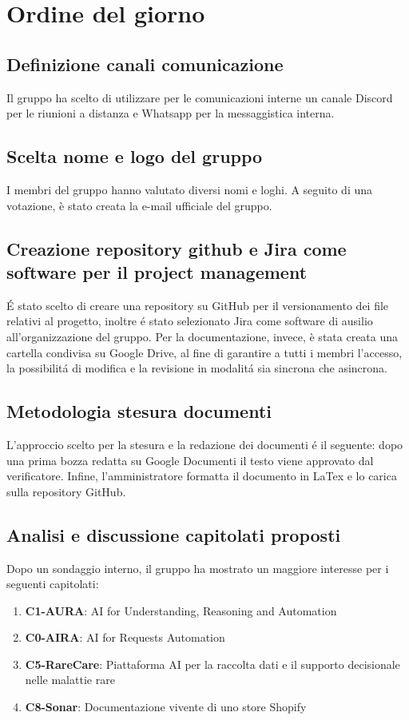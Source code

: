 \newpage
\vspace{0.8cm}

\section{Ordine del giorno}

\subsection{Definizione canali comunicazione}
Il gruppo ha scelto di utilizzare per le comunicazioni interne un canale Discord per le riunioni a distanza e Whatsapp per la messaggistica interna.

\subsection{Scelta nome e logo del gruppo}
I membri del gruppo hanno valutato diversi nomi e loghi. A seguito di una votazione, è stato creata la e-mail ufficiale del gruppo.

\subsection{Creazione repository github e Jira come software per il project management}
É stato scelto di creare una repository su GitHub per il versionamento dei file relativi al progetto, inoltre é stato selezionato Jira come software di ausilio all'organizzazione del gruppo. Per la documentazione, invece, è stata creata una cartella condivisa su Google Drive, al fine di garantire a tutti i membri l'accesso, la possibilitá di modifica e la revisione in modalitá sia sincrona che asincrona.

\subsection{Metodologia stesura documenti}
L'approccio scelto per la stesura e la redazione dei documenti é il seguente: dopo una prima bozza redatta su Google Documenti il testo viene approvato dal verificatore. Infine, l'amministratore formatta il documento in LaTex e lo carica sulla repository GitHub.

\subsection{Analisi e discussione capitolati proposti}
Dopo un sondaggio interno, il gruppo ha mostrato un maggiore interesse per i seguenti capitolati:
\begin{enumerate}
    \item \textbf{C1-AURA}: AI for Understanding, Reasoning and Automation
    \item \textbf{C0-AIRA}: AI for Requests Automation
    \item \textbf{C5-RareCare}: Piattaforma AI per la raccolta dati e il supporto decisionale nelle malattie rare
    \item \textbf{C8-Sonar}: Documentazione vivente di uno store Shopify
\end{enumerate}

